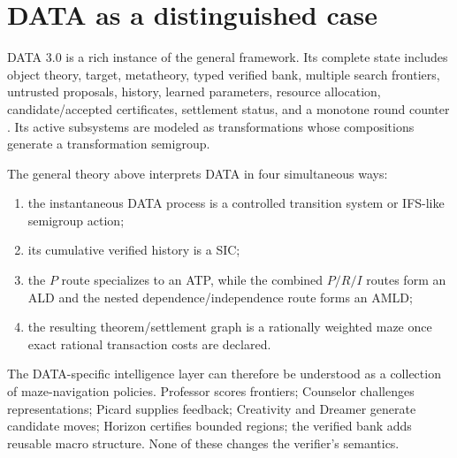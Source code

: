 \section{DATA as a distinguished case}
DATA 3.0 is a rich instance of the general framework. Its complete state includes object theory, target, metatheory, typed verified bank, multiple search frontiers, untrusted proposals, history, learned parameters, resource allocation, candidate/accepted certificates, settlement status, and a monotone round counter \cite{data3}. Its active subsystems are modeled as transformations whose compositions generate a transformation semigroup.

The general theory above interprets DATA in four simultaneous ways:
\begin{enumerate}
\item the instantaneous DATA process is a controlled transition system or IFS-like semigroup action;
\item its cumulative verified history is a SIC;
\item the $P$ route specializes to an ATP, while the combined $P/R/I$ routes form an ALD and the nested dependence/independence route forms an AMLD;
\item the resulting theorem/settlement graph is a rationally weighted maze once exact rational transaction costs are declared.
\end{enumerate}

The DATA-specific intelligence layer can therefore be understood as a collection of maze-navigation policies. Professor scores frontiers; Counselor challenges representations; Picard supplies feedback; Creativity and Dreamer generate candidate moves; Horizon certifies bounded regions; the verified bank adds reusable macro structure. None of these changes the verifier's semantics.

